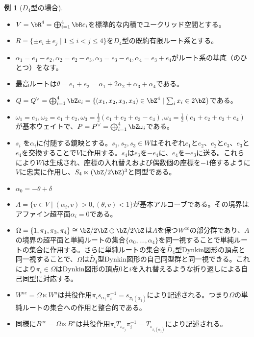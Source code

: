 \documentclass[uplatex, a4paper, dvipdfmx]{jsarticle}
\theoremstyle{definition}
\newtheorem{example}[theorem]{例}
\begin{document}
\begin{example}[$D_4$型の場合]
    \begin{itemize}
        \item  $V = \bR^4 = \bigoplus_{i=1}^4 \bR e_i$を標準的な内積でユークリッド空間とする。
        \item  $R = \{\pm e_i \pm e_j \mid 1 \leq i < j \leq 4\}$を$D_4$型の既約有限ルート系とする。
        \item $\alpha_1 = e_1 - e_2, \alpha_2 = e_2 - e_3, \alpha_3 = e_3 - e_4, \alpha_4 = e_3 + e_4$がルート系の基底（のひとつ）をなす。
        \item 最高ルートは$\theta = e_1 + e_2 = \alpha_1 + 2\alpha_2 + \alpha_3 + \alpha_4$である。
        \item $Q = Q^\vee = \bigoplus_{i=1}^4 \bZ e_i = \{(x_1, x_2, x_3, x_4) \in \bZ^4\mid \sum_i x_i \in 2 \bZ\}$である。
        \item $\omega_1 = e_1, \omega_2 = e_1 + e_2, \omega_3 = \frac{1}{2}(e_1 + e_2 + e_3 - e_4), \omega_4 = \frac{1}{2}(e_1 + e_2 + e_3 + e_4)$が基本ウェイトで、$P = P^\vee = \bigoplus_{i=1}^4 \bZ \omega_i$である。
        \item $s_i$ を$\alpha_i$に付随する鏡映とする。$s_1, s_2, s_3 \in W$はそれぞれ$e_1$と$e_2$、$e_2$と$e_3$、$e_3$と$e_4$を交換することで$V$に作用する。$s_4$は$e_3$を$-e_4$に、$e_4$を$-e_3$に送る。これらにより$W$は生成され、座標の入れ替えおよび偶数個の座標を$-1$倍するように$V$に忠実に作用し、$S_4 \ltimes (\bZ/2\bZ)^3$と同型である。
        \item $\alpha_0 = -\theta + \delta$
        \item $A = \{v \in V \mid (\alpha_i, v)>0, (\theta, v)<1\}$が基本アルコーブである。その境界はアファイン超平面$\alpha_i = 0$である。
        \item $\Omega = \{1, \pi_1, \pi_3, \pi_4\} \cong \bZ/2\bZ \oplus \bZ/2\bZ$は$A$を保つ$W^{ae}$の部分群であり、$A$の境界の超平面と単純ルートの集合$\{\alpha_0, \dots, \alpha_4\}$を同一視することで単純ルートの集合に作用する。さらに単純ルートの集合を$\widetilde{D_4}$型Dynkin図形の頂点と同一視することで、$\Omega$は$\widetilde{D_4}$型Dynkin図形の自己同型群と同一視できる。これにより$\pi_i \in \Omega$はDynkin図形の頂点$0$と$i$を入れ替えるような折り返しによる自己同型に対応する。
        \item $W^{ae} = \Omega \ltimes W^a$は共役作用$\pi_i s_{\alpha_j} \pi_i^{-1} = s_{\pi_i(\alpha_j)}$により記述される。つまり$\Omega$の単純ルートの集合への作用と整合的である。
        \item 同様に$B^{ae} = \Omega \ltimes B^a$は共役作用$\pi_i T_{s_{\alpha_j}} \pi_i^{-1} = T_{s_{\pi_i(\alpha_j)}}$により記述される。
    \end{itemize}
\end{example}
\end{document}
